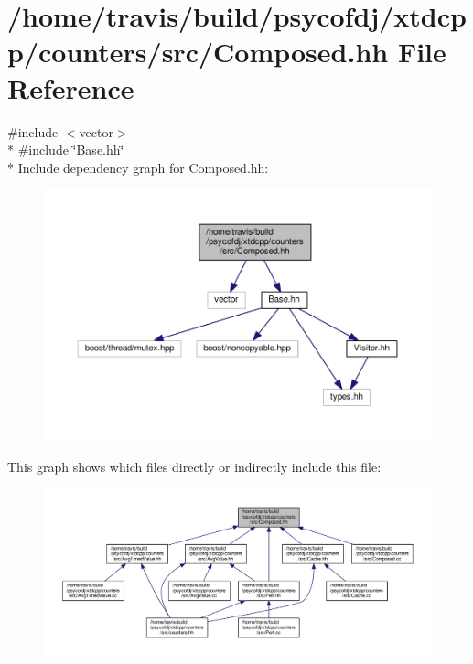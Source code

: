 \hypertarget{Composed_8hh}{\section{/home/travis/build/psycofdj/xtdcpp/counters/src/\-Composed.hh File Reference}
\label{Composed_8hh}
}
{\ttfamily \#include $<$vector$>$}\\*
{\ttfamily \#include \char`\"{}Base.\-hh\char`\"{}}\\*
Include dependency graph for Composed.\-hh\-:
\nopagebreak
\begin{figure}[H]
\begin{center}
\leavevmode
\includegraphics[width=350pt]{Composed_8hh__incl}
\end{center}
\end{figure}
This graph shows which files directly or indirectly include this file\-:
\nopagebreak
\begin{figure}[H]
\begin{center}
\leavevmode
\includegraphics[width=350pt]{Composed_8hh__dep__incl}
\end{center}
\end{figure}
